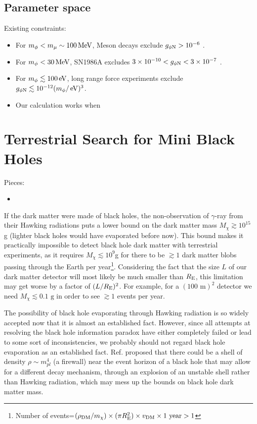\documentclass[%
 reprint,
 amsmath,amssymb,
 aps,nofootinbib
]{revtex4-1}
\newcommand{\eV}{\mathinner{\mathrm{eV}}}
\newcommand{\MeV}{\mathinner{\mathrm{MeV}}}
\begin{document}
\subsection{Parameter space}
Existing constraints:
\begin{itemize}
    \item For $m_\phi<m_\mu\sim 100\MeV$, Meson decays exclude $g_{\phi\rm N}>10^{-6}$ \citep{Grabowska:2018lnd}.
    \item For $m_\phi<30\MeV$, SN1986A excludes $3\times 10^{-10}<g_{\phi \rm N}<3\times 10^{-7}$ \cite{Grabowska:2018lnd}.
    \item For $m_\phi\lesssim 100\eV$, long range force experiments exclude $g_{\phi\rm N}\lesssim 10^{-12} (m_\phi/\eV)^3$\cite{Grabowska:2018lnd}.
    \item Our calculation works when 
\end{itemize}





\section{Terrestrial Search for Mini Black Holes}
Pieces:
\begin{itemize}
\item 
\end{itemize}

If the dark matter were made of black holes, the non-observation of $\gamma$-ray from their Hawking radiations puts a lower bound on the dark matter mass $M_\chi\gtrsim 10^{15}$g (lighter black holes would have evaporated before now). This bound makes it practically impossible to detect black hole dark matter with terrestrial experiments, as it requires $M_\chi\lesssim 10^{9}$g for there to be $\gtrsim 1$ dark matter blobs passing through the Earth per year\footnote{Number of events=$(\rho_{\rm DM}/m_\chi)\times(\pi R_{\rm E}^2)\times v_{\rm DM}\times 1 \text{ year}> 1$}. Considering the fact that the size $L$ of our dark matter detector will most likely be much smaller than $R_{\rm E}$, this limitation may get worse by a factor of $(L/R_{\rm E})^2$. For example, for a $(100\text{ m})^2$ detector we need $M_\chi\lesssim 0.1\text{ g}$ in order to see $\gtrsim 1$ events per year.

The possibility of black hole evaporating through Hawking radiation is so widely accepted now that it is almost an established fact. However, since all attempts at resolving the black hole information paradox have either completely failed or lead to some sort of inconsistencies, we probably should not regard black hole evaporation as an established fact. Ref. \cite{Kaplan:2018dqx} proposed that there could be a shell of density $\rho\sim m_{pl}^4$ (a firewall) near the event horizon of a black hole that may allow for a different decay mechanism, through an explosion of an unstable shell rather than Hawking radiation, which may mess up the bounds on black hole dark matter mass.
\end{document}
